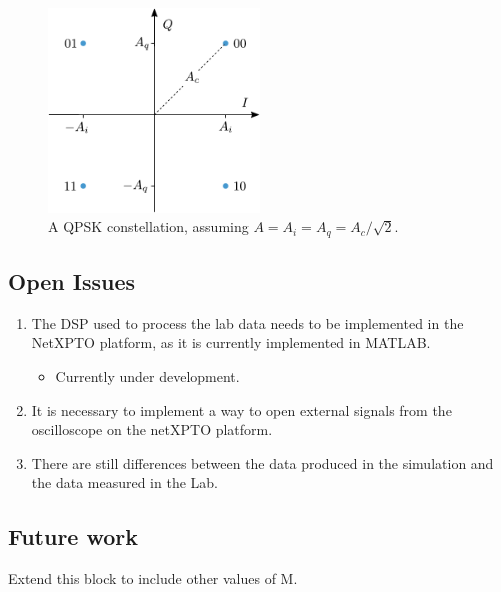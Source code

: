 \begin{refsection}
	\begin{figure}[H]
		\centering
		\includegraphics[width=0.5\textwidth]{./sdf/m_qam_system/figures/intro/constellation.pdf}
		\caption{A QPSK constellation, assuming $ A = A_i = A_q =
			A_c/\sqrt{2}$.\label{fig:const_2m}}
	\end{figure}

    
    
    
    


\clearpage
	\subsection{Open Issues}
	\begin{enumerate}
		\item The DSP used to process the lab data needs to be implemented in the NetXPTO platform, as it is currently
			implemented in MATLAB.
		\begin{itemize}
			\item Currently under development.
		\end{itemize}
		\item It is necessary to implement a way to open external signals from
			the oscilloscope on the netXPTO platform.
		\item There are still differences between the data produced in the simulation
			and the data measured in the Lab.
	\end{enumerate}

	\subsection{Future work}
	Extend this block to include other values of M.



	\clearpage
	\printbibliography[heading=subbibliography]
\end{refsection}
\cleardoublepage


